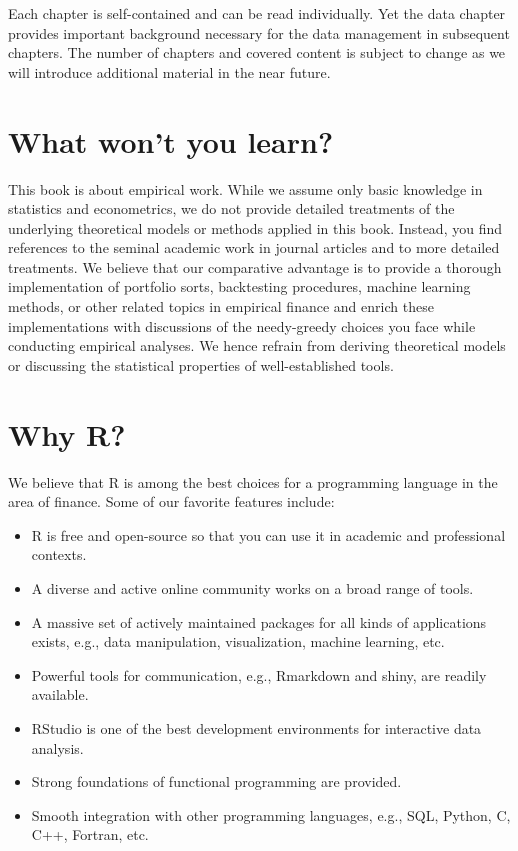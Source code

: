 \documentclass[
]{book}
\providecommand{\tightlist}{%
  \setlength{\itemsep}{0pt}\setlength{\parskip}{0pt}}
\begin{document}
Each chapter is self-contained and can be read individually. Yet the data chapter provides important background necessary for the data management in subsequent chapters. The number of chapters and covered content is subject to change as we will introduce additional material in the near future.

\hypertarget{what-wont-you-learn}{%
\section*{What won't you learn?}\label{what-wont-you-learn}}


This book is about empirical work. While we assume only basic knowledge in statistics and econometrics, we do not provide detailed treatments of the underlying theoretical models or methods applied in this book. Instead, you find references to the seminal academic work in journal articles and to more detailed treatments.
We believe that our comparative advantage is to provide a thorough implementation of portfolio sorts, backtesting procedures, machine learning methods, or other related topics in empirical finance and enrich these implementations with discussions of the needy-greedy choices you face while conducting empirical analyses. We hence refrain from deriving theoretical models or discussing the statistical properties of well-established tools.

\hypertarget{why-r}{%
\section*{Why R?}\label{why-r}}


We believe that R is among the best choices for a programming language in the area of finance. Some of our favorite features include:

\begin{itemize}
\tightlist
\item
  R is free and open-source so that you can use it in academic and professional contexts.
\item
  A diverse and active online community works on a broad range of tools.
\item
  A massive set of actively maintained packages for all kinds of applications exists, e.g., data manipulation, visualization, machine learning, etc.
\item
  Powerful tools for communication, e.g., Rmarkdown and shiny, are readily available.
\item
  RStudio is one of the best development environments for interactive data analysis.
\item
  Strong foundations of functional programming are provided.
\item
  Smooth integration with other programming languages, e.g., SQL, Python, C, C++, Fortran, etc.
\end{itemize}
\end{document}
